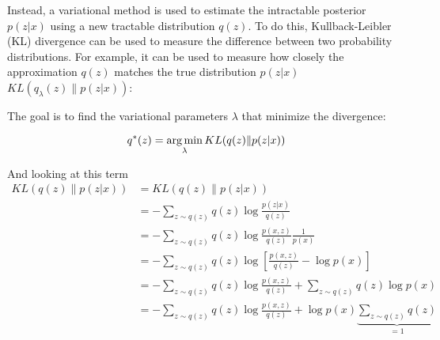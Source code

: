 






Instead, a variational method is used to estimate the intractable posterior $p(z|x)$ using a new tractable distribution $q(z)$. To do this, Kullback-Leibler (KL) divergence can be used to measure the difference between two probability distributions. For example, it can be used to measure how closely the approximation $q(z)$ matches the true distribution $p(z|x)$ 
$KL(q_{\lambda}(z) \| p(z|x))$:

The goal is to find the variational parameters $\lambda$ that minimize the divergence:

\begin{equation}
  q^{*}(z) = \operatorname*{arg\,min}_{\lambda} KL(q(z) \| p(z|x))
\end{equation}

And looking at this term
$$
\begin{aligned}
KL(q(z) \| p(z|x))
  &= KL(q(z) \| p(z|x)) \\
  &= -\sum_{z \sim q(z)} q(z) \log \frac{p(z|x)}{q(z)} \\
  &= -\sum_{z \sim q(z)} q(z) \log \frac{p(x,z)}{q(z)} \frac{1}{p(x)} \\
  &= -\sum_{z \sim q(z)} q(z) \log \left[ \frac{p(x,z)}{q(z)} - \log p(x) \right] \\
  &= -\sum_{z \sim q(z)} q(z) \log \frac{p(x,z)}{q(z)} 
  + \sum_{z \sim q(z)} q(z) \log p(x) \\
  &= -\sum_{z \sim q(z)} q(z) \log \frac{p(x,z)}{q(z)} 
  + \log p(x) \underbrace{\sum_{z \sim q(z)} q(z)}_{=1} \\
\end{aligned}
$$

